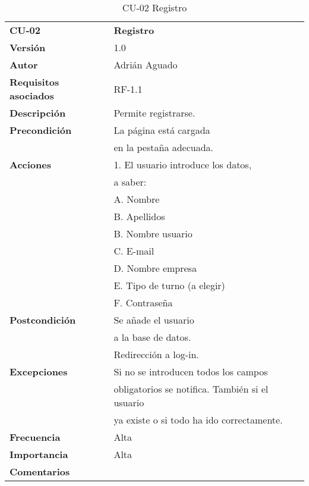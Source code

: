 \begin{table}[H]
\begin{tabular}{llr}  
\toprule
\begin{minipage}[b]{0.24\columnwidth}\raggedright\strut
\textbf{CU-02}\strut
\end{minipage} & \begin{minipage}[b]{0.72\columnwidth}\raggedright\strut
\textbf{Registro}\strut
\end{minipage}\tabularnewline
\cmidrule(r){1-2}
\textbf{Versión}       & 1.0           \\
\textbf{Autor}       & Adrián  Aguado    \\
\textbf{Requisitos asociados}       & RF-1.1 \\ 
\textbf{Descripción} & Permite registrarse.\\
\textbf{Precondición} & La página está cargada  \\
& en la pestaña adecuada.     \\
\textbf{Acciones} & 1. El usuario introduce los datos, \\
& a saber: \\
& A. Nombre \\
& B. Apellidos\\
& B. Nombre usuario\\
& C. E-mail\\
& D. Nombre empresa\\
& E. Tipo de turno (a elegir)\\
& F. Contraseña\\
\textbf{Postcondición} & Se añade el usuario \\
& a la base de datos.     \\
& Redirección a log-in.  \\
\textbf{Excepciones} &  Si no se introducen todos los campos  \\
& obligatorios se notifica. También si el usuario \\
& ya existe o si todo ha ido correctamente.    \\
\textbf{Frecuencia} & Alta            \\
\textbf{Importancia} & Alta            \\
\textbf{Comentarios } &       \\
\bottomrule
\end{tabular}
\caption{CU-02 Registro} 
\end{table}

